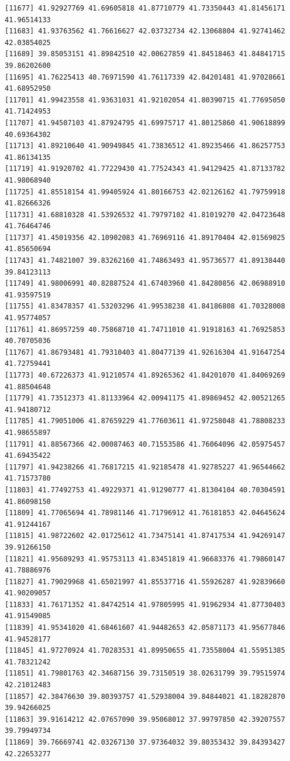 \documentclass[
  letterpaper,
  DIV=11,
  numbers=noendperiod]{scrartcl}
\begin{document}
\begin{verbatim}
[11677] 41.92927769 41.69605818 41.87710779 41.73350443 41.81456171 41.96514133
[11683] 41.93763562 41.76616627 42.03732734 42.13068804 41.92741462 42.03854025
[11689] 39.85053151 41.89842510 42.00627859 41.84518463 41.84841715 39.86202600
[11695] 41.76225413 40.76971590 41.76117339 42.04201481 41.97028661 41.68952950
[11701] 41.99423558 41.93631031 41.92102054 41.80390715 41.77695050 41.71424953
[11707] 41.94507103 41.87924795 41.69975717 41.80125860 41.90618899 40.69364302
[11713] 41.89210640 41.90949845 41.73836512 41.89235466 41.86257753 41.86134135
[11719] 41.91920702 41.77229430 41.77524343 41.94129425 41.87133782 41.98068940
[11725] 41.85518154 41.99405924 41.80166753 42.02126162 41.79759918 41.82666326
[11731] 41.68810328 41.53926532 41.79797102 41.81019270 42.04723648 41.76464746
[11737] 41.45019356 42.10902083 41.76969116 41.89170404 42.01569025 41.85650694
[11743] 41.74821007 39.83262160 41.74863493 41.95736577 41.89138440 39.84123113
[11749] 41.98006991 40.82887524 41.67403960 41.84280856 42.06988910 41.93597519
[11755] 41.83478357 41.53203296 41.99538238 41.84186808 41.70328008 41.95774057
[11761] 41.86957259 40.75868710 41.74711010 41.91918163 41.76925853 40.70705036
[11767] 41.86793481 41.79310403 41.80477139 41.92616304 41.91647254 41.72759441
[11773] 40.67226373 41.91210574 41.89265362 41.84201070 41.84069269 41.88504648
[11779] 41.73512373 41.81133964 42.00941175 41.89869452 42.00521265 41.94180712
[11785] 41.79051006 41.87659229 41.77603611 41.97258048 41.78808233 41.98655897
[11791] 41.88567366 42.00087463 40.71553586 41.76064096 42.05975457 41.69435422
[11797] 41.94238266 41.76817215 41.92185478 41.92785227 41.96544662 41.71573780
[11803] 41.77492753 41.49229371 41.91290777 41.81304104 40.70304591 41.86098150
[11809] 41.77065694 41.78981146 41.71796912 41.76181853 42.04645624 41.91244167
[11815] 41.98722602 42.01725612 41.73475141 41.87417534 41.94269147 39.91266150
[11821] 41.95609293 41.95753113 41.83451819 41.96683376 41.79860147 41.78886976
[11827] 41.79029968 41.65021997 41.85537716 41.55926287 41.92839660 41.90209057
[11833] 41.76171352 41.84742514 41.97805995 41.91962934 41.87730403 41.91549085
[11839] 41.95341020 41.68461607 41.94482653 42.05871173 41.95677846 41.94528177
[11845] 41.97270924 41.70283531 41.89950655 41.73558004 41.55951385 41.78321242
[11851] 41.79801763 42.34687156 39.73150519 38.02631799 39.79515974 42.21012483
[11857] 42.38476630 39.80393757 41.52938004 39.84844021 41.18282870 39.94266025
[11863] 39.91614212 42.07657090 39.95068012 37.99797850 42.39207557 39.79949734
[11869] 39.76669741 42.03267130 37.97364032 39.80353432 39.84393427 42.22653277

\end{verbatim}
\end{document}
